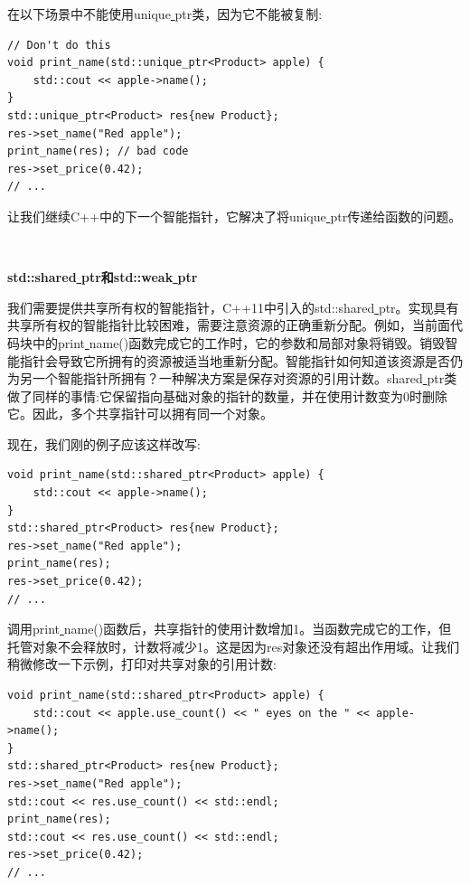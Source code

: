 在以下场景中不能使用unique\underline{ }ptr类，因为它不能被复制: \par

\begin{lstlisting}[caption={}]
// Don't do this
void print_name(std::unique_ptr<Product> apple) {
	std::cout << apple->name();
}
std::unique_ptr<Product> res{new Product};
res->set_name("Red apple");
print_name(res); // bad code
res->set_price(0.42);
// ...
\end{lstlisting}

让我们继续C++中的下一个智能指针，它解决了将unique\underline{ }ptr传递给函数的问题。 \par

\noindent\textbf{}\ \par
\textbf{std::shared\underline{ }ptr和std::weak\underline{ }ptr} \ \par
我们需要提供共享所有权的智能指针，C++11中引入的std::shared\underline{ }ptr。实现具有共享所有权的智能指针比较困难，需要注意资源的正确重新分配。例如，当前面代码块中的print\underline{ }name()函数完成它的工作时，它的参数和局部对象将销毁。销毁智能指针会导致它所拥有的资源被适当地重新分配。智能指针如何知道该资源是否仍为另一个智能指针所拥有？一种解决方案是保存对资源的引用计数。shared\underline{ }ptr类做了同样的事情:它保留指向基础对象的指针的数量，并在使用计数变为0时删除它。因此，多个共享指针可以拥有同一个对象。 \par
现在，我们刚的例子应该这样改写: \par

\begin{lstlisting}[caption={}]
void print_name(std::shared_ptr<Product> apple) {
	std::cout << apple->name();
}
std::shared_ptr<Product> res{new Product};
res->set_name("Red apple");
print_name(res);
res->set_price(0.42);
// ...
\end{lstlisting}

调用print\underline{ }name()函数后，共享指针的使用计数增加1。当函数完成它的工作，但托管对象不会释放时，计数将减少1。这是因为res对象还没有超出作用域。让我们稍微修改一下示例，打印对共享对象的引用计数: \par

\begin{lstlisting}[caption={}]
void print_name(std::shared_ptr<Product> apple) {
	std::cout << apple.use_count() << " eyes on the " << apple->name();
}
std::shared_ptr<Product> res{new Product};
res->set_name("Red apple");
std::cout << res.use_count() << std::endl;
print_name(res);
std::cout << res.use_count() << std::endl;
res->set_price(0.42);
// ...
\end{lstlisting}

